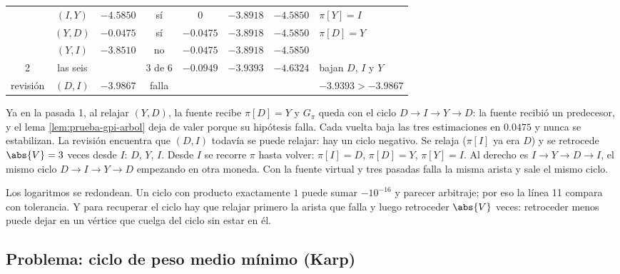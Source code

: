 \documentclass[11pt,letterpaper]{article}
\begin{document}
\begin{ejemplo}
\begin{center}
\begin{tabular}{cccccccl}
      & $(I, Y)$ & $-4.5850$ & sí & $0$ & $-3.8918$ & $-4.5850$
      & $\pi[Y] = I$ \\
      & $(Y, D)$ & $-0.0475$ & sí & $-0.0475$ & $-3.8918$
      & $-4.5850$ & $\pi[D] = Y$ \\
      & $(Y, I)$ & $-3.8510$ & no & $-0.0475$ & $-3.8918$
      & $-4.5850$ & \\
    \midrule
    2 & las seis & & 3 de 6 & $-0.0949$ & $-3.9393$ & $-4.6324$
      & bajan $D$, $I$ y $Y$ \\
    \midrule
    revisión & $(D, I)$ & $-3.9867$ & falla & & & &
      $-3.9393 > -3.9867$ \\
    \bottomrule
  \end{tabular}
  \end{center}
  Ya en la pasada 1, al relajar $(Y, D)$, la fuente recibe
  $\pi[D] = Y$ y $G_\pi$ queda con el ciclo $D \to I \to Y \to D$: la
  fuente recibió un predecesor, y el lema
  \ref{lem:prueba-gpi-arbol} deja de valer porque su hipótesis falla.
  Cada vuelta baja las tres estimaciones en $0.0475$ y nunca se
  estabilizan. La revisión encuentra que $(D, I)$ todavía se puede
  relajar: hay un ciclo negativo. Se relaja ($\pi[I]$ ya era $D$) y se
  retrocede $\abs{V} = 3$ veces desde $I$: $D$, $Y$, $I$. Desde $I$ se
  recorre $\pi$ hasta volver: $\pi[I] = D$, $\pi[D] = Y$,
  $\pi[Y] = I$. Al derecho es $I \to Y \to D \to I$, el mismo ciclo
  $D \to I \to Y \to D$ empezando en otra moneda. Con la fuente
  virtual y tres pasadas falla la misma arista y sale el mismo ciclo.
\end{ejemplo}

\begin{ojo}
  Los logaritmos se redondean. Un ciclo con producto exactamente $1$
  puede sumar $-10^{-16}$ y parecer arbitraje; por eso la línea 11
  compara con tolerancia. Y para recuperar el ciclo hay que relajar
  primero la arista que falla y luego retroceder $\abs{V}$ veces:
  retroceder menos puede dejar en un vértice que cuelga del ciclo sin
  estar en él.
\end{ojo}


\subsection*{Problema: ciclo de peso medio mínimo (Karp)}
\end{document}

